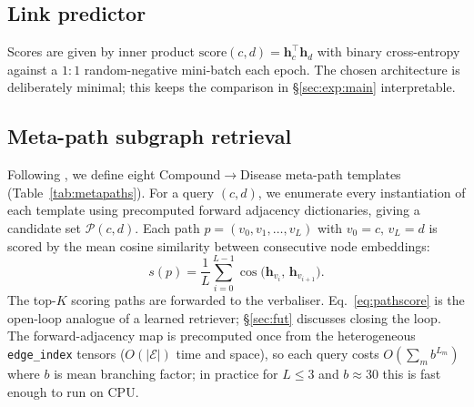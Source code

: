 \documentclass{article}
\begin{document}
\subsection{Link predictor}
Scores are given by inner product $\mathrm{score}(c,d) = \mathbf{h}_c^{\top}\mathbf{h}_d$ with binary cross-entropy against a $1{:}1$ random-negative mini-batch each epoch. The chosen architecture is deliberately minimal; this keeps the comparison in \S\ref{sec:exp:main} interpretable.

\subsection{Meta-path subgraph retrieval}
\label{sec:method:retrieval}
Following \citet{himmelstein2017}, we define eight Compound$\to$Disease meta-path templates (Table~\ref{tab:metapaths}). For a query $(c,d)$, we enumerate every instantiation of each template using precomputed forward adjacency dictionaries, giving a candidate set $\mathcal{P}(c,d)$. Each path $p=(v_0,v_1,\ldots,v_L)$ with $v_0{=}c,\,v_L{=}d$ is scored by the mean cosine similarity between consecutive node embeddings:
\begin{equation}
s(p) = \frac{1}{L}\sum_{i=0}^{L-1} \cos\!\bigl(\mathbf{h}_{v_i},\,\mathbf{h}_{v_{i+1}}\bigr).
\label{eq:pathscore}
\end{equation}
The top-$K$ scoring paths are forwarded to the verbaliser. Eq.~\eqref{eq:pathscore} is the open-loop analogue of a learned retriever; \S\ref{sec:fut} discusses closing the loop. The forward-adjacency map is precomputed once from the heterogeneous \texttt{edge\_index} tensors ($O(|\mathcal{E}|)$ time and space), so each query costs $O(\sum_m b^{L_m})$ where $b$ is mean branching factor; in practice for $L{\le}3$ and $b{\approx}30$ this is fast enough to run on CPU.
\end{document}

